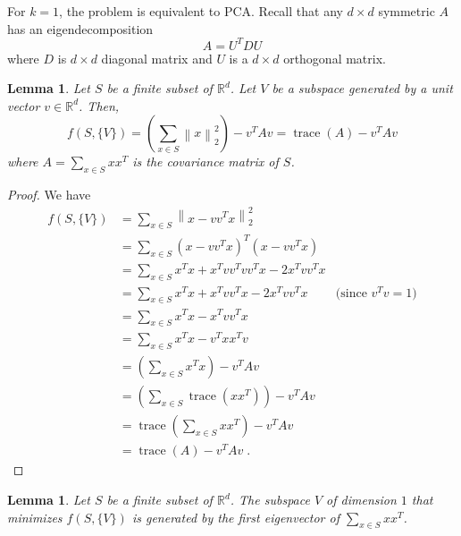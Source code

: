 \documentclass{article}
\newtheorem{lemma}[theorem]{Lemma}
\newcommand{\R}{\mathbb{R}}
\newcommand{\norm}[1]{\left\|#1\right\|}
\DeclareMathOperator*{\trace}{trace}
\begin{document}
For $k=1$, the problem is equivalent to PCA. Recall that any $d \times d$
symmetric $A$ has an eigendecomposition
$$
A = U^T D U
$$
where $D$ is $d \times d$ diagonal matrix and $U$ is a $d \times d$
orthogonal matrix.

\begin{lemma}
Let $S$ be a finite subset of $\R^d$. Let $V$ be a subspace
generated by a unit vector $v \in \R^d$. Then,
$$
f(S,\{V\})
= \left(\sum_{x \in S} \norm{x}_2^2 \right) - v^T A v
= \trace(A) - v^T A v
$$
where $A = \sum_{x \in S} xx^T$ is the covariance matrix of $S$.
\end{lemma}

\begin{proof}
We have
\begin{align*}
f(S, \{V\})
& = \sum_{x \in S} \norm{x - vv^T x}_2^2 \\
& = \sum_{x \in S} (x - vv^T x)^T (x - vv^Tx) \\
& = \sum_{x \in S} x^Tx + x^T vv^T vv^T x - 2 x^T vv^T x  \\
& = \sum_{x \in S} x^Tx + x^T vv^T x - 2 x^T vv^T x & \text{(since $v^Tv = 1$)} \\
& = \sum_{x \in S} x^Tx - x^T vv^T x  \\
& = \sum_{x \in S} x^Tx - v^T xx^T v  \\
& = \left(\sum_{x \in S} x^Tx \right) - v^T A v  \\
& = \left(\sum_{x \in S} \trace(xx^T) \right) - v^T A v \\
& = \trace \left(\sum_{x \in S} xx^T \right) - v^T A v \\
& = \trace(A) - v^T A v \; .
\end{align*}
\end{proof}

\begin{lemma}
Let $S$ be a finite subset of $\R^d$.
The subspace $V$ of dimension $1$ that minimizes $f(S, \{V\})$ is generated
by the first eigenvector of $\sum_{x \in S} xx^T$.
\end{lemma}
\end{document}
